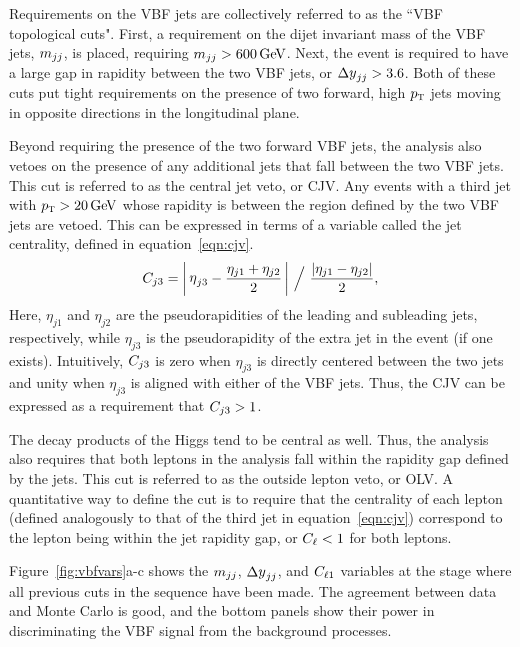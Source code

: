 Requirements on the VBF jets are collectively referred to as the ``VBF topological cuts". First, a requirement on the dijet invariant mass of the VBF jets, $m_{jj}$, is placed, requiring $\mjj > 600 \GeV$. Next, the event is required to have a large gap in rapidity between the two VBF jets, or $\dyjj > 3.6$. Both of these cuts put tight requirements on the presence of two forward, high $p_{\textrm{\footnotesize\sc t}}$ jets moving in opposite directions in the longitudinal plane. 

Beyond requiring the presence of the two forward VBF jets, the analysis also vetoes on the presence of any additional jets that fall between the two VBF jets. This cut is referred to as the central jet veto, or CJV. Any events with a third jet with $\pT > 20 \GeV$ whose rapidity is between the region defined by the two VBF jets are vetoed. This can be expressed in terms of a variable called the jet centrality, defined in equation~\ref{eqn:cjv}.
%
\begin{equation}
\cjv = \bigg|\, \etathirdjet - \frac{\eta_{j1} + \eta_{j2}}{2} \,\bigg|\ \Big/\ \frac{\left|\eta_{j1} - \eta_{j2}\right|}{2},
\label{eqn:cjv}
\end{equation}
%
Here, $\eta_{j1}$ and $\eta_{j2}$ are the pseudorapidities of the leading and subleading jets, respectively, while $\eta_{j3}$ is the pseudorapidity of the extra jet in the event (if one exists). Intuitively, $C_{j3}$ is zero when $\eta_{j3}$ is directly centered between the two jets and unity when $\eta_{j3}$ is aligned with either of the VBF jets. Thus, the CJV can be expressed as a requirement that $C_{j3} > 1$. 

The decay products of the Higgs tend to be central as well. Thus, the analysis also requires that both leptons in the analysis fall within the rapidity gap defined by the jets. This cut is referred to as the outside lepton veto, or OLV. A quantitative way to define the cut is to require that the centrality of each lepton (defined analogously to that of the third jet in equation~\ref{eqn:cjv}) correspond to the lepton being within the jet rapidity gap, or $C_{\ell} < 1$ for both leptons. 

Figure~\ref{fig:vbfvars}a-c shows the $m_{jj}$, $\dyjj$, and $C_{\ell1}$ variables at the stage where all previous cuts in the sequence have been made. The agreement between data and Monte Carlo is good, and the bottom panels show their power in discriminating the VBF signal from the background processes. 

